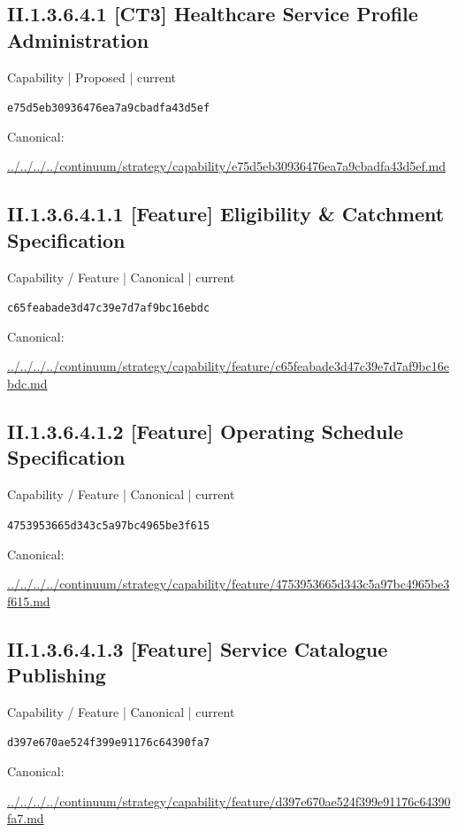 \documentclass[10pt,a4paper]{article}
\begin{document}
\subsection*{II.1.3.6.4.1 [CT3] Healthcare Service Profile Administration}
{\small Capability | Proposed | current}\par
\texttt{e75d5eb30936476ea7a9cbadfa43d5ef}\par
Canonical: \par
{\footnotesize\url{../../../../continuum/strategy/capability/e75d5eb30936476ea7a9cbadfa43d5ef.md}}\par
\subsection*{II.1.3.6.4.1.1 [Feature] Eligibility \& Catchment Specification}
{\small Capability / Feature | Canonical | current}\par
\texttt{c65feabade3d47c39e7d7af9bc16ebdc}\par
Canonical: \par
{\footnotesize\url{../../../../continuum/strategy/capability/feature/c65feabade3d47c39e7d7af9bc16ebdc.md}}\par
\subsection*{II.1.3.6.4.1.2 [Feature] Operating Schedule Specification}
{\small Capability / Feature | Canonical | current}\par
\texttt{4753953665d343c5a97bc4965be3f615}\par
Canonical: \par
{\footnotesize\url{../../../../continuum/strategy/capability/feature/4753953665d343c5a97bc4965be3f615.md}}\par
\subsection*{II.1.3.6.4.1.3 [Feature] Service Catalogue Publishing}
{\small Capability / Feature | Canonical | current}\par
\texttt{d397e670ae524f399e91176c64390fa7}\par
Canonical: \par
{\footnotesize\url{../../../../continuum/strategy/capability/feature/d397e670ae524f399e91176c64390fa7.md}}\par
\end{document}
